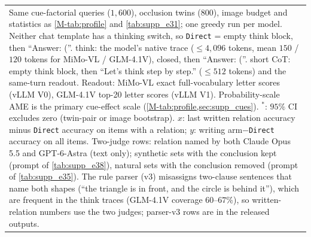 \begin{tabular}{@{}lcccc@{}}
\bottomrule
\multicolumn{5}{p{0.95\linewidth}}{\scriptsize Same cue-factorial queries ($1{,}600$), occlusion twins ($800$), image budget and statistics as \cref{M-tab:profile} and \cref{tab:supp_e31}; one greedy run per model. Neither chat template has a thinking switch, so \texttt{Direct} = empty think block, then ``Answer: (''. think: the model's native trace ($\le 4{,}096$ tokens, mean $150$ / $120$ tokens for MiMo-VL / GLM-4.1V), closed, then ``Answer: (''. short CoT: empty think block, then ``Let's think step by step.'' ($\le 512$ tokens) and the same-turn readout. Readout: MiMo-VL exact full-vocabulary letter scores (vLLM V0), GLM-4.1V top-20 letter scores (vLLM V1). Probability-scale AME is the primary cue-effect scale (\cref{M-tab:profile,sec:supp_cues}). $^\ast$: $95\%$ CI excludes zero (twin-pair or image bootstrap). $x$: last written relation accuracy minus \texttt{Direct} accuracy on items with a relation; $y$: writing arm$-$\texttt{Direct} accuracy on all items. Two-judge rows: relation named by both Claude Opus 5.5 and GPT-6-Astra (text only); synthetic sets with the conclusion kept (prompt of \cref{tab:supp_e38}), natural sets with the conclusion removed (prompt of \cref{tab:supp_e35}). The rule parser (v3) misassigns two-clause sentences that name both shapes (``the triangle is in front, and the circle is behind it''), which are frequent in the think traces (GLM-4.1V coverage $60$--$67\%$), so written-relation numbers use the two judges; parser-v3 rows are in the released outputs.} \\
\end{tabular}
